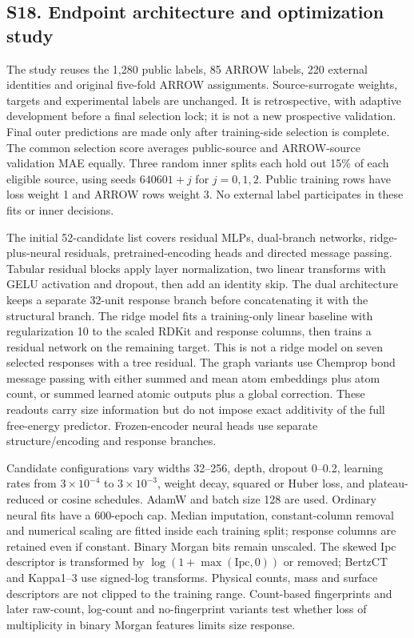 \subsection*{S18. Endpoint architecture and optimization study}

The study reuses the 1,280 public labels, 85 ARROW labels, 220 external identities
and original five-fold ARROW assignments. Source-surrogate weights, targets and
experimental labels are unchanged. It is retrospective, with adaptive development
before a final selection lock; it is not a new prospective validation. Final outer
predictions are made only after training-side selection is complete. The common
selection score averages public-source and ARROW-source validation MAE equally.
Three random inner splits each hold out 15\% of each eligible source, using seeds
$640601+j$ for $j=0,1,2$. Public training rows have loss weight 1 and ARROW rows
weight 3. No external label participates in these fits or inner decisions.

The initial 52-candidate list covers residual MLPs, dual-branch networks,
ridge-plus-neural residuals, pretrained-encoding heads and directed message passing.
Tabular residual blocks apply layer normalization, two linear transforms with GELU
activation and dropout, then add an identity skip. The dual architecture keeps a
separate 32-unit response branch before concatenating it with the structural branch.
The ridge model fits a training-only linear baseline with regularization 10 to the
scaled RDKit and response columns, then trains a residual network on the remaining
target. This is not a ridge model on seven selected responses with a tree residual.
The graph variants use Chemprop bond message passing with either summed and mean
atom embeddings plus atom count, or summed learned atomic outputs plus a global
correction. These readouts carry size information but do not impose exact additivity
of the full free-energy predictor. Frozen-encoder neural heads use separate
structure/encoding and response branches.

Candidate configurations vary widths 32--256, depth, dropout 0--0.2, learning rates
from $3\times10^{-4}$ to $3\times10^{-3}$, weight decay, squared or Huber loss,
and plateau-reduced or cosine schedules. AdamW and batch size 128 are used.
Ordinary neural fits have a 600-epoch cap. Median imputation, constant-column
removal and numerical scaling are fitted inside each training split; response
columns are retained even if constant. Binary Morgan bits remain unscaled.
The skewed Ipc descriptor is transformed by $\log(1+\max(\mathrm{Ipc},0))$ or
removed; BertzCT and Kappa1--3 use signed-log transforms. Physical counts, mass
and surface descriptors are not clipped to the training range. Count-based
fingerprints and later raw-count, log-count and no-fingerprint variants test whether
loss of multiplicity in binary Morgan features limits size response.

